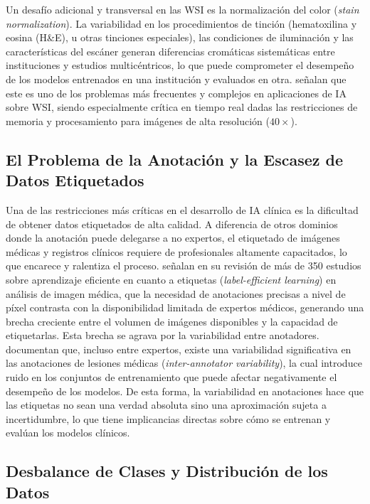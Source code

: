 Un desafío adicional y transversal en las WSI es la normalización del color (\textit{stain normalization}). La variabilidad en
los procedimientos de tinción (hematoxilina y eosina (H\&E), u otras tinciones especiales), las condiciones de iluminación y las
características del escáner generan diferencias cromáticas sistemáticas entre instituciones y estudios multicéntricos, 
lo que puede comprometer el desempeño de los modelos entrenados en una institución y evaluados en otra. 
\textcite{Basak2023} señalan que este es uno de los problemas más frecuentes y complejos en 
aplicaciones de IA sobre WSI, siendo especialmente crítica en tiempo real dadas las restricciones de memoria y procesamiento 
para imágenes de alta resolución ($40\times$).

\subsection{El Problema de la Anotación y la Escasez de Datos Etiquetados}

Una de las restricciones más críticas en el desarrollo de IA clínica es la dificultad de obtener 
datos etiquetados de alta calidad. A diferencia de otros dominios donde la anotación puede 
delegarse a no expertos, el etiquetado de imágenes médicas y registros clínicos requiere de 
profesionales altamente capacitados, lo que encarece y ralentiza el proceso. \textcite{jin2025labelefficientdeeplearningmedical} 
señalan en su revisión de más de 350 estudios sobre aprendizaje eficiente en cuanto a etiquetas 
(\textit{label-efficient learning}) en análisis de imagen médica, que la necesidad de anotaciones 
precisas a nivel de píxel contrasta con la disponibilidad limitada de expertos médicos, generando 
una brecha creciente entre el volumen de imágenes disponibles y la capacidad de etiquetarlas. 
Esta brecha se agrava por la variabilidad entre anotadores. \textcite{Yang2023} documentan que, 
incluso entre expertos, existe una variabilidad significativa en las anotaciones de lesiones 
médicas (\textit{inter-annotator variability}), la cual introduce ruido en los conjuntos de 
entrenamiento que puede afectar negativamente el desempeño de los modelos.
De esta forma, la variabilidad en anotaciones hace que las etiquetas no sean una verdad absoluta sino
una aproximación sujeta a incertidumbre, lo que tiene implicancias directas sobre cómo se entrenan y 
evalúan los modelos clínicos.

\subsection{Desbalance de Clases y Distribución de los Datos}

